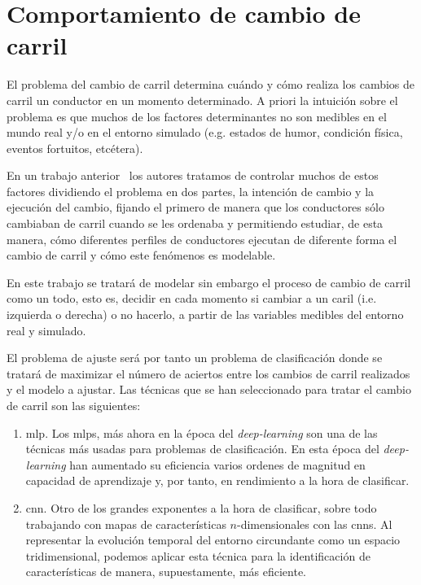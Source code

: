 \chapter{Comportamiento de cambio de carril}
\label{ch:lane-change-model}

El problema del cambio de carril determina cuándo y cómo realiza los cambios de carril un conductor en un momento determinado. A priori la intuición sobre el problema es que muchos de los factores determinantes no son medibles en el mundo real y/o en el entorno simulado (e.g. estados de humor, condición física, eventos fortuitos, etcétera).

En un trabajo anterior~\cite{CITA DEL ARTÍCULO DE LANE EXECUTION CUANDO NOS LO PUBLIQUEN} los autores tratamos de controlar muchos de estos factores dividiendo el problema en dos partes, la intención de cambio y la ejecución del cambio, fijando el primero de manera que los conductores sólo cambiaban de carril cuando se les ordenaba y permitiendo estudiar, de esta manera, cómo diferentes perfiles de conductores ejecutan de diferente forma el cambio de carril y cómo este fenómenos es modelable.

En este trabajo se tratará de modelar sin embargo el proceso de cambio de carril como un todo, esto es, decidir en cada momento si cambiar a un caril (i.e. izquierda o derecha) o no hacerlo, a partir de las variables medibles del entorno real y simulado.

El problema de ajuste será por tanto un problema de clasificación donde se tratará de maximizar el número de aciertos entre los cambios de carril realizados y el modelo a ajustar. Las técnicas que se han seleccionado para tratar el cambio de carril son las siguientes:

\begin{enumerate}
	\item \ac{mlp}. Los \acp{mlp}, más ahora en la época del \textit{deep-learning} son una de las técnicas más usadas para problemas de clasificación. En esta época del \textit{deep-learning} han aumentado su eficiencia varios ordenes de magnitud en capacidad de aprendizaje y, por tanto, en rendimiento a la hora de clasificar.
	\item \ac{cnn}. Otro de los grandes exponentes a la hora de clasificar, sobre todo trabajando con mapas de características $n$-dimensionales con las \acp{cnn}. Al representar la evolución temporal del entorno circundante como un espacio tridimensional, podemos aplicar esta técnica para la identificación de características de manera, supuestamente, más eficiente.
\end{enumerate}

